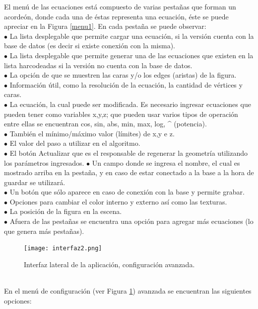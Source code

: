 \documentclass[12pt]{article}
\begin{document}
El menú de las ecuaciones está compuesto de varias pestañas que forman un acordeón, donde cada una de éstas representa una ecuación, éste se puede apreciar en la Figura \ref{menu1}. En cada pestaña se puede observar:
\\$\bullet$ La lista desplegable que permite cargar una ecuación, si la versión cuenta con la base de datos (es decir si existe conexión con la misma).
\\$\bullet$ La lista desplegable que permite generar una de las ecuaciones que existen en la lista harcodeadas si la versión no cuenta con la base de datos. 
\\$\bullet$ La opción de que se muestren las caras y/o los edges (aristas) de la figura.
\\$\bullet$ Información útil, como la resolución de la ecuación, la cantidad de vértices y caras.
\\$\bullet$ La ecuación, la cual puede ser modificada. Es necesario ingresar ecuaciones que pueden tener como variables x,y,z; que pueden usar varios tipos de operación entre ellas se encuentran cos, sin, abs, min, max, log, \string^ (potencia).
\\$\bullet$ También el mínimo/máximo valor (límites) de x,y e z.
\\$\bullet$ El valor del paso a utilizar en el algoritmo.
\\$\bullet$ El botón Actualizar que es el responsable de regenerar la geometría utilizando los parámetros ingresados.
\clearpage
$\bullet$ Un campo donde se ingresa el nombre, el cual es mostrado arriba en la pestaña, y en caso de estar conectado a la base a la hora de guardar se utilizará.
\\$\bullet$ Un botón que sólo aparece en caso de conexión con la base y permite grabar.
\\$\bullet$ Opciones para cambiar el color interno y externo así como las texturas.
\\$\bullet$ La posición de la figura en la escena.
\\$\bullet$ Afuera de las pestañas se encuentra una opción para agregar más ecuaciones (lo que genera más pestañas). \\
\begin{figure}
\texttt{[image: interfaz2.png]} 
\caption{Interfaz lateral de la aplicación, configuración avanzada.}
\label{menu2}
\end{figure}
\\En el menú de configuración (ver Figura \ref{menu2}) avanzada se encuentran las siguientes opciones:
\end{document}
